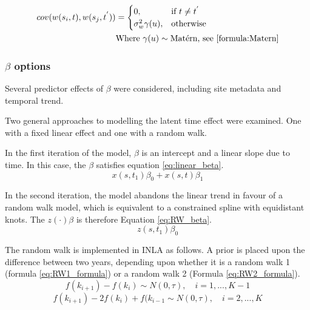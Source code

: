 \begin{align} \label{eq:cov_structure}
	cov(w(s_i,t), w(s_j,t^{'})) &=
	\begin{cases} 
		0, & \text{if } t \neq t^{'} \\
		\sigma^2_w \gamma(u), & \text{otherwise}    
	\end{cases} \\
	& \text{Where } \gamma(u) \sim \text{Mat\'{e}rn, see \ref{formula:Matern}} \nonumber
\end{align} 

\subsubsection*{$\beta$ options}
\label{subsubsec:betaopts}
Several predictor effects of $\beta$ were considered, including site metadata and temporal trend.

Two general approaches to modelling the latent time effect were examined.  One with a fixed linear effect and one with a random walk.

In the first iteration of the model, $\beta$ is an intercept and a linear slope due to time.  In this case, the $\beta$ satisfies equation \ref{eq:linear_beta}.
\begin{equation} \label{eq:linear_beta} 
x(s,t_1)\beta_0 + x(s,t)\beta_1
\end{equation}  

In the second iteration, the model abandons the linear trend in favour of a random walk model, which is equivalent to a constrained spline with equidistant knots.  The $z(\cdot)\beta$ is therefore Equation \ref{eq:RW_beta}.
\begin{equation} \label{eq:RW_beta}
z(s,t_1)\beta_0
\end{equation}

The random walk is implemented in \ac{INLA} as follows.  A prior is placed upon the difference between two years, depending upon whether it is a random walk 1 (formula \ref{eq:RW1_formula}) or a random walk 2 (Formula \ref{eq:RW2_formula}).
\begin{equation} \label{eq:RW1_formula}
f(k_{i + 1}) - f(k_i) \sim N(0,\tau), \quad i = 1, ..., K-1
\end{equation}
\begin{equation} \label{eq:RW2_formula}
f(k_{i+1}) - 2f(k_i) + f(k_{i-1} \sim N(0, \tau), \quad i = 2, ..., K
\end{equation}


